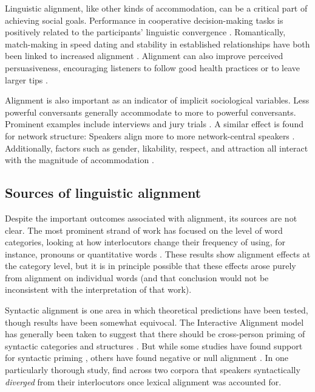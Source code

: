 \documentclass[11pt]{article}
\begin{document}
Linguistic alignment, like other kinds of accommodation, can be a critical part of achieving social goals.  Performance in cooperative decision-making tasks is  positively related to the participants' linguistic convergence \cite{FusaroliEtAl2012,KacewiczEtAl2013}.  Romantically, match-making in speed dating and stability in established relationships have both been linked to increased alignment \cite{IrelandEtAl2011}. Alignment can also improve perceived persuasiveness, encouraging listeners to follow good health practices \cite{KlineCeropski1984} or to leave larger tips \cite{vanBaarenEtAl2003}.

Alignment is also important as an indicator of implicit sociological variables. Less powerful conversants generally accommodate to more to powerful conversants. Prominent examples include interviews and jury trials \cite{WillemynsEtAl1997,Gnisci2005,DNMEtAl2012}.  A similar effect is found for network structure: Speakers align more to more network-central speakers \cite{NobleFernandez2015}.  Additionally, factors such as gender, likability, respect, and attraction all interact with the magnitude of accommodation \cite{BilousKrauss1988,Natale1975}.

\subsection{Sources of linguistic alignment}

Despite the important outcomes associated with alignment, its sources are not clear. The most prominent strand of work has focused on the level of word categories, looking at how interlocutors change their frequency of using, for instance, pronouns or quantitative words \cite{DNMEtAl2012,IrelandEtAl2011}. These results show alignment effects at the category level, but it is in principle possible that these effects arose purely from alignment on individual words (and that conclusion would not be inconsistent with the interpretation of that work).

Syntactic alignment is one area in which theoretical predictions have been tested, though results have been somewhat equivocal. The Interactive Alignment model has generally been taken to suggest that there should be cross-person priming of syntactic categories and structures \cite{PickeringGarrod2004}. But while some studies have found support for syntactic priming \cite{gries2005syntactic,dubey2005parallelism}, others have found negative or null alignment \cite{HealeyPurverHowes2014,reitter2010priming}. In one particularly thorough study, \cite{HealeyPurverHowes2014} find across two corpora that speakers syntactically \emph{diverged} from their interlocutors once lexical alignment was accounted for.
\end{document}
